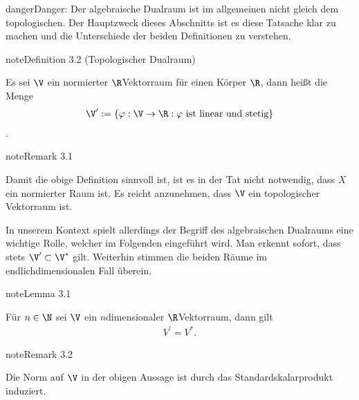 \documentclass[letterpaper,10pt,english]{jupyterBook}
\begin{document}
\begin{sphinxadmonition}{danger}{Danger:}
\sphinxAtStartPar
Der algebraische Dualraum ist im allgemeinen nicht gleich dem topologischen. Der Hauptzweck dieses Abschnitts ist es diese Tatsache klar zu machen und die Unterschiede der beiden Definitionen zu verstehen.
\end{sphinxadmonition}
\label{vektoranalysis/multilinear:definition-1}
\begin{sphinxadmonition}{note}{Definition 3.2 (Topologischer Dualraum)}



\sphinxAtStartPar
Es sei \(\V\) ein normierter \(\R\)\sphinxhyphen{}Vektorraum für einen Körper \(\R\), dann heißt die Menge
\begin{equation*}
\begin{split}\V^\prime := \{\varphi:\V\rightarrow\R: \varphi\text{ ist linear und stetig}\}\end{split}
\end{equation*}
\sphinxAtStartPar
{}.
\end{sphinxadmonition}
\label{vektoranalysis/multilinear:remark-2}
\begin{sphinxadmonition}{note}{Remark 3.1}



\sphinxAtStartPar
Damit die obige Definition sinnvoll ist, ist es in der Tat nicht notwendig, dass \(X\) ein normierter Raum ist. Es reicht anzunehmen, dass \(\V\) ein topologischer Vektorraum ist.
\end{sphinxadmonition}

\sphinxAtStartPar
In unserem Kontext spielt allerdings der Begriff des algebraischen Dualraums eine wichtige Rolle, welcher im Folgenden eingeführt wird. Man erkennt sofort, dass stets \(\V^\prime\subset \V^\ast\) gilt. Weiterhin stimmen die beiden Räume im endlich\sphinxhyphen{}dimensionalen Fall überein.
\label{vektoranalysis/multilinear:lemma-3}
\begin{sphinxadmonition}{note}{Lemma 3.1}



\sphinxAtStartPar
Für \(n\in\N\) sei \(\V\) ein \(n\)\sphinxhyphen{}dimensionaler \(\R\)\sphinxhyphen{}Vektorraum, dann gilt
\begin{equation*}
\begin{split}V^\prime = V^\ast.\end{split}
\end{equation*}\end{sphinxadmonition}
\label{vektoranalysis/multilinear:remark-4}
\begin{sphinxadmonition}{note}{Remark 3.2}



\sphinxAtStartPar
Die Norm auf \(\V\) in der obigen Aussage ist durch das Standardskalarprodukt induziert.
\end{sphinxadmonition}
\end{document}
